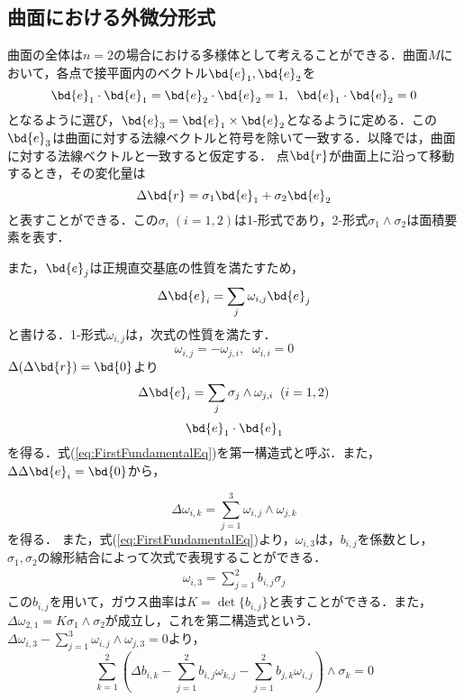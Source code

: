 	\subsection{曲面における外微分形式}
		曲面の全体は$ n=2 $の場合における多様体として考えることができる．曲面$ M $において，各点で接平面内のベクトル$ \bd{e}_1,\bd{e}_2 $を
		\begin{equation}\label{eq:e1e2}
			\bd{e}_1 \cdot \bd{e}_1 = \bd{e}_2 \cdot \bd{e}_2 = 1, \;\; \bd{e}_1 \cdot \bd{e}_2  = 0
		\end{equation}
		となるように選び，$ \bd{e}_3 = \bd{e}_1 \times \bd{e}_2 $となるように定める．この$ \bd{e}_3 $は曲面に対する法線ベクトルと符号を除いて一致する．以降では，曲面に対する法線ベクトルと一致すると仮定する．
		点$ \bd{r} $が曲面上に沿って移動するとき，その変化量は
		\begin{equation}\label{eq:dreq}
			\Delta \bd{r} = \sigma_1 \bd{e}_1 + \sigma_2 \bd{e}_2
		\end{equation}
		と表すことができる．この$ \sigma_i \;(i=1,2) $は1-形式であり，2-形式$ \sigma_1 \wedge \sigma_2 $は面積要素を表す．
		
		また，$ \bd{e}_j $は正規直交基底の性質を満たすため，
		\begin{equation}\label{eq:de_jeq}
			\Delta \bd{e}_i = \sum_j \omega_{i,j} \bd{e}_j
		\end{equation}
		と書ける．1-形式$ \omega_{i,j} $は，次式の性質を満たす．
		\begin{equation}\label{eq:omega_ijeq}
			\omega_{i,j} = - \omega_{j,i},\;\; \omega_{i,i} = 0
		\end{equation}
		$ \Delta (\Delta \bd{r}) = \bd{0} $より
		\begin{equation}
			\Delta \bd{e}_i = \sum_j \sigma_j \wedge \omega_{j,i}\;\;(i=1,2) 
		\end{equation}
		\begin{equation}\label{eq:FirstFundamentalEq}
			\bd{e}_1 \cdot \bd{e}_1
		\end{equation}
		を得る．式(\ref{eq:FirstFundamentalEq})を第一構造式と呼ぶ．また，$ \Delta \Delta \bd{e}_i =\bd{0}$から，
		
		\begin{equation}\label{eq:d_omgEq}
			\Delta \omega_{i,k} = \sum_{j=1}^{3} \omega_{i,j} \wedge \omega_{j,k}
		\end{equation}
		を得る．
		また，式(\ref{eq:FirstFundamentalEq})より，$ \omega_{i,3} $は，$ b_{i,j} $を係数とし，$ \sigma_1,\sigma_2 $の線形結合によって次式で表現することができる．
		\begin{eqnarray}
			\omega_{i,3} = \sum_{j=1}^2 b_{i,j} \sigma_j
		\end{eqnarray}
		この$ b_{i,j} $を用いて，ガウス曲率は$ K=\det \{b_{i,j}\} $と表すことができる．また，$ \Delta \omega_{2,1} = K \sigma_1 \wedge \sigma_2  $が成立し，これを第二構造式という．
		$ \Delta \omega_{i,3} - \sum_{j=1}^{3} \omega_{i,j} \wedge \omega_{j,3} = 0 $より，
		\begin{equation}\label{eq:DeltaBeq}
			\sum_{k=1}^{2} (\Delta b_{i,k} - \sum_{j=1}^2 b_{i,j} \omega_{k,j} - \sum_{j=1}^2 b_{j,k} \omega_{i,j}) \wedge \sigma_k = 0
		\end{equation}

